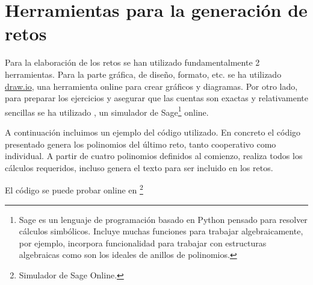 

\section{Herramientas para la generación de retos}

Para la elaboración de los retos se han utilizado fundamentalmente 2 herramientas.
%
Para la parte gráfica, de diseño, formato, etc. se ha utilizado \url{draw.io}, una herramienta online para crear gráficos y diagramas.
%
Por otro lado, para preparar los ejercicios y asegurar que las cuentas son exactas y relativamente sencillas se ha utilizado , un simulador de Sage\footnote{Sage es un lenguaje de programación basado en Python pensado para resolver cálculos simbólicos.
%
Incluye muchas funciones para trabajar algebraicamente, por ejemplo, incorpora funcionalidad para trabajar con estructuras algebraicas como son los ideales de anillos de polinomios.
} online.

A continuación incluimos un ejemplo del código utilizado. 
%
En concreto el código presentado genera los polinomios del último reto, tanto cooperativo como individual.
%
A partir de cuatro polinomios definidos al comienzo, realiza todos los cálculos requeridos, incluso genera el texto para ser incluido en los retos.

El código se puede probar online en  \footnote{Simulador de Sage Online.}


